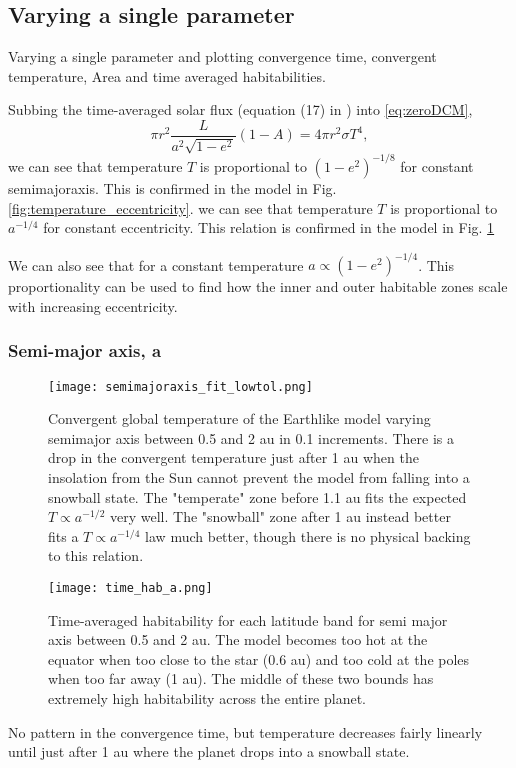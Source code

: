 \documentclass[12pt, onecolumn]{revtex4-2}    %
\begin{document}
\subsection{Varying a single parameter} \label{sec:single_param}

Varying a single parameter and plotting convergence time, convergent temperature, Area and time averaged habitabilities.

Subbing the time-averaged solar flux (equation (17) in \cite{Mendez2017}) into \ref{eq:zeroDCM},
\begin{equation}
    \pi r^2 \frac{L}{a^2 \sqrt{1-e^2}} (1-A) = 4\pi r^2 \sigma T^4,
    \label{eq:Temp_eccent}
\end{equation}
we can see that temperature $T$ is proportional to $(1-e^2)^{-1/8}$ for constant semimajoraxis. This is confirmed in the model in Fig. \ref{fig:temperature_eccentricity}.
we can see that temperature $T$ is proportional to $a^{-1/4}$ for constant eccentricity. This relation is confirmed in the model in Fig. \ref{fig:temperature_semimajoraxis}

We can also see that for a constant temperature $a \propto (1-e^2)^{-1/4}$.
This proportionality can be used to find how the inner and outer habitable zones scale with increasing eccentricity.

\subsubsection*{Semi-major axis, a}
\begin{figure}
    \texttt{[image: semimajoraxis\_fit\_lowtol.png]}
    \caption{Convergent global temperature of the Earthlike model varying semimajor axis between 0.5 and 2 au in 0.1 increments.
        There is a drop in the convergent temperature just after 1 au when the insolation from the Sun cannot prevent the model from falling into a snowball state.
        The "temperate" zone before 1.1 au fits the expected $T\propto a^{-1/2}$ very well.
        The "snowball" zone after 1 au instead better fits a $T\propto a^{-1/4}$ law much better, though there is no physical backing to this relation.}
    \label{fig:temperature_semimajoraxis}
\end{figure}
\begin{figure}
    \texttt{[image: time\_hab\_a.png]}
    \caption{
        Time-averaged habitability for each latitude band for semi major axis between 0.5 and 2 au.
        The model becomes too hot at the equator when too close to the star (0.6 au) and too cold at the poles when too far away (1 au).
        The middle of these two bounds has extremely high habitability across the entire planet.
    }
\end{figure}
No pattern in the convergence time, but temperature decreases fairly linearly until just after 1 au where the planet drops into a snowball state.
\end{document}
